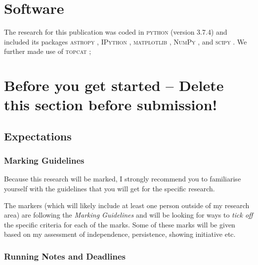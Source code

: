 \documentclass[fleqn,usenatbib]{mnras}
\begin{document}

\section*{Software}

The research for this publication was coded in \textsc{python} (version 3.7.4) and included its packages
\textsc{astropy} \citep[v. 3.2.2;][]{Robitaille2013,PriceWhelan2018},
\textsc{IPython} \citep[v. 7.8.0;][]{ipython},
\textsc{matplotlib} \citep[v. 3.1.3;][]{matplotlib},
\textsc{NumPy} \citep[v. 1.17.2;][]{numpy}, and
\textsc{scipy} \citep[version 1.3.1;][]{scipy}.
We further made use of \textsc{topcat} \citep[version 4.7;][]{Taylor2005};



\newpage

\appendix

\section{Before you get started -- Delete this section before submission!}

\subsection{Expectations}

\subsubsection{Marking Guidelines}

Because this research will be marked, I strongly recommend you to familiarise yourself with the guidelines that you will get for the specific research.

The markers (which will likely include at least one person outside of my research area) are following the \textit{Marking Guidelines} and will be looking for ways to \textit{tick off} the specific criteria for each of the marks. Some of these marks will be given based on my assessment of independence, persistence, showing initiative etc.

\subsubsection{Running Notes and Deadlines}
\end{document}
